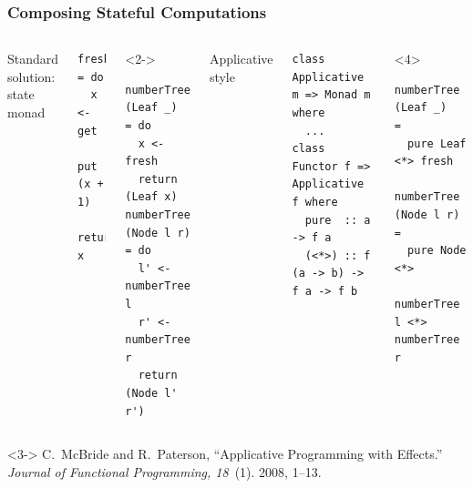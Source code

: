 \documentclass[smaller,leqno]{beamer}
\newenvironment{reference}{\begingroup\scriptsize\singlespacing\color{gray}}{\par\endgroup}
\begin{document}
\begin{frame}[fragile]
\frametitle{Composing Stateful Computations}

\begin{columns}[t,onlytextwidth]
Standard solution: \\state monad
\vspace{5mm}
\begin{lstlisting}
fresh = do
  x <- get
  put (x + 1)
  return x
\end{lstlisting}

\begin{uncoverenv}<2->\begin{lstlisting}
numberTree (Leaf _)   = do
  x <- fresh
  return (Leaf x)
numberTree (Node l r) = do
  l' <- numberTree l
  r' <- numberTree r
  return (Node l' r')
\end{lstlisting}\end{uncoverenv}

Applicative style
\vspace{5mm}
\begin{lstlisting}
class Applicative m => Monad m where
  ...
class Functor f => Applicative f where
  pure  :: a -> f a
  (<*>) :: f (a -> b) -> f a -> f b
\end{lstlisting}

\begin{uncoverenv}<4>\begin{lstlisting}
numberTree (Leaf _)   =
  pure Leaf <*> fresh

numberTree (Node l r) =
  pure Node <*>
    numberTree l <*> numberTree r
\end{lstlisting}\end{uncoverenv}
\end{columns}

\vspace{\fill}
\begin{uncoverenv}<3->\begin{reference}
C.\ McBride and R.\ Paterson, ``Applicative Programming with Effects.''
\emph{Journal of Functional Programming, 18}~(1). 2008, 1--13.
\end{reference}\end{uncoverenv}
\end{frame}
\end{document}
